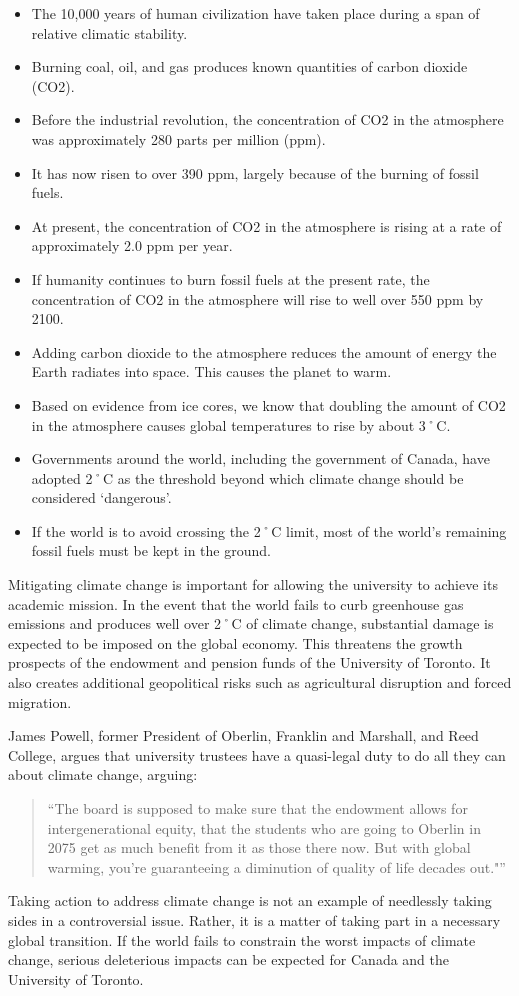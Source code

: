 \begin{itemize}
	\item The 10,000 years of human civilization have taken place during a span of relative climatic stability.
	\item Burning coal, oil, and gas produces known quantities of carbon dioxide (CO2).
	\item Before the industrial revolution, the concentration of CO2 in the atmosphere was approximately 280 parts per million (ppm). 
	\item It has now risen to over 390 ppm, largely because of the burning of fossil fuels.
	\item At present, the concentration of CO2 in the atmosphere is rising at a rate of approximately 2.0 ppm per year.
	\item If humanity continues to burn fossil fuels at the present rate, the concentration of CO2 in the atmosphere will rise to well over 550 ppm by 2100.
	\item Adding carbon dioxide to the atmosphere reduces the amount of energy the Earth radiates into space. This causes the planet to warm.
	\item Based on evidence from ice cores, we know that doubling the amount of CO2 in the atmosphere causes global temperatures to rise by about 3˚C.
	\item Governments around the world, including the government of Canada, have adopted 2˚C as the threshold beyond which climate change should be considered `dangerous'.
	\item If the world is to avoid crossing the 2˚C limit, most of the world's remaining fossil fuels must be kept in the ground.
\end{itemize}

Mitigating climate change is important for allowing the university to achieve its academic mission. 
In the event that the world fails to curb greenhouse gas emissions and produces well over 2˚C of climate change, substantial damage is expected to be imposed on the global economy. 
This threatens the growth prospects of the endowment and pension funds of the University of Toronto. 
It also creates additional geopolitical risks such as agricultural disruption and forced migration.

James Powell, former President of Oberlin, Franklin and Marshall, and Reed College, argues that university trustees have a quasi-legal duty to do all they can about climate change, arguing:
\begin{quotation}
``The board is supposed to make sure that the endowment allows for intergenerational equity, that the students who are going to Oberlin in 2075 get as much benefit from it as those there now. But with global warming, you’re guaranteeing a diminution of quality of life decades out."''
\end{quotation}
Taking action to address climate change is not an example of needlessly taking sides in a controversial issue. Rather, it is a matter of taking part in a necessary global transition. 
If the world fails to constrain the worst impacts of climate change, serious deleterious impacts can be expected for Canada and the University of Toronto.



